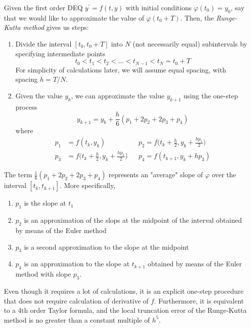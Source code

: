\documentclass{article}
\newcounter{theorem}[section]
\begin{document}
    \begin{theorem}
      \label{thm:runge-kutta-method}
    Given the first order DEQ $y^\prime = f(t, y)$ with initial conditions $\varphi(t_0) = y_0$, say that we would like to approximate the value of $\varphi(t_0 + T)$. Then, the \textit{Runge-Kutta method} gives us steps: 
    \begin{enumerate}
        \item Divide the interval $[t_0, t_0 + T]$ into $N$ (not necessarily equal) subintervals by specifying intermediate points 
        \begin{equation}
          t_0 < t_1 < t_2 < \ldots < t_{N-1} < t_N = t_0 + T
        \end{equation}
        For simplicity of calculations later, we will assume equal spacing, with spacing $h = T/N$. 
        \item Given the value $y_k$, we can approximate the value $y_{k+1}$ using the one-step process
        \begin{equation}
          y_{k+1} = y_k + \frac{h}{6} (p_1 + 2p_2 + 2p_3 + p_4)
        \end{equation}
        where 
        \begin{align*}
            p_1 & = f(t_k, y_k) & & p_2 = f\bigg( t_k + \frac{h}{2}, y_k + \frac{h p_1}{2}\bigg)  \\
            p_3 & = f\bigg( t_k + \frac{h}{2} , y_k + \frac{h p_2}{2} \bigg) & & p_4 = f(t_{k+1}, y_k + h p_3)
        \end{align*}
    \end{enumerate}
    The term $\frac{1}{6} (p_1 + 2p_2 + 2p_3 + p_4)$ represents an "average" slope of $\varphi$ over the interval $[t_k, t_{k+1}]$. More specifically, 
    \begin{enumerate}
        \item $p_1$ is the slope at $t_1$
        \item $p_2$ is an approximation of the slops at the midpoint of the interval obtained by means of the Euler method
        \item $p_3$ is a second approximation to the slope at the midpoint
        \item $p_4$ is an approximation to the slope at $t_{k+1}$ obtained by means of the Euler method with slope $p_3$. 
    \end{enumerate}
    Even though it requires a lot of calculations, it is an explicit one-step procedure that does not require calculation of derivative of $f$. Furthermore, it is equivalent to a 4th order Taylor formula, and the local truncation error of the Runge-Kutta method is no greater than a constant multiple of $h^5$. 
    \end{theorem}
\end{document}
